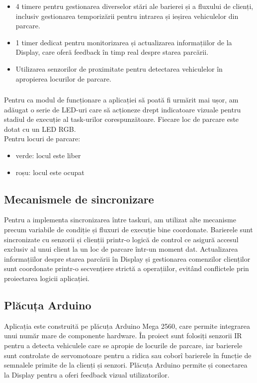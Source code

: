 \documentclass[a4paper,11pt]{report}
\begin{document}
\begin{itemize}
    \item 4 timere pentru gestionarea diverselor stări ale barierei și a fluxului de clienți, inclusiv gestionarea temporizării pentru intrarea și ieșirea vehiculelor din parcare.
    \item 1 timer dedicat pentru monitorizarea și actualizarea informațiilor de la Display, care oferă feedback în timp real despre starea parcării.
    \item Utilizarea senzorilor de proximitate pentru detectarea vehiculelor în apropierea locurilor de parcare.
\end{itemize}

\subsubsection{\color{black}}
Pentru ca modul de funcționare a aplicației să poată fi urmărit mai ușor, am adăugat o serie de LED-uri care să acționeze drept indicatoare vizuale pentru stadiul de execuție al task-urilor corespunzătoare. Fiecare loc de parcare este dotat cu un LED RGB. \\


\noindent
Pentru locuri de parcare:
\begin{itemize}
    \item verde: locul este liber 
    \item roșu: locul este ocupat

\end{itemize}

\subsection{Mecanismele de sincronizare}
Pentru a implementa sincronizarea între taskuri, am utilizat alte mecanisme precum variabile de condiție și fluxuri de execuție bine coordonate. Barierele sunt sincronizate cu senzorii și clienții printr-o logică de control ce asigură accesul exclusiv al unui client la un loc de parcare într-un moment dat. Actualizarea informațiilor despre starea parcării în Display și gestionarea comenzilor clienților sunt coordonate printr-o secvențiere strictă a operațiilor, evitând conflictele prin proiectarea logicii aplicației.

\subsection{Plăcuța Arduino}
Aplicația este construită pe plăcuța Arduino Mega 2560, care permite integrarea unui număr mare de componente hardware. În proiect sunt folosiți senzorii IR pentru a detecta vehiculele care se apropie de locurile de parcare, iar barierele sunt controlate de servomotoare pentru a ridica sau coborî barierele în funcție de semnalele primite de la clienți și senzori. Plăcuța Arduino permite și conectarea la Display pentru a oferi feedback vizual utilizatorilor.
\end{document}
